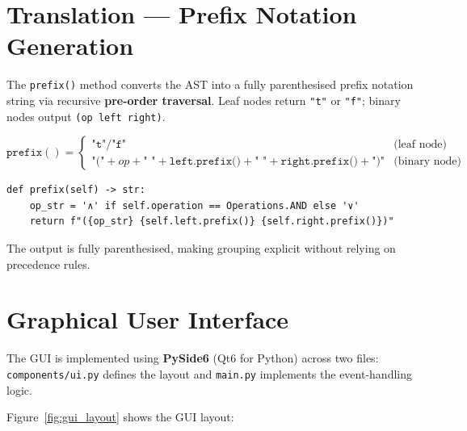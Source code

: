 \section{Translation --- Prefix Notation Generation}

The \texttt{prefix()} method converts the AST into a fully parenthesised prefix notation string via recursive \textbf{pre-order traversal}.  Leaf nodes return \texttt{"t"} or \texttt{"f"}; binary nodes output \texttt{(op left right)}.

\begin{equation}
\texttt{prefix}() = \begin{cases}
\texttt{"t"} / \texttt{"f"} & \text{(leaf node)} \\[4pt]
\texttt{"("} + op + \texttt{" "} + \texttt{left.prefix()} + \texttt{" "} + \texttt{right.prefix()} + \texttt{")"} & \text{(binary node)}
\end{cases}
\end{equation}

\begin{lstlisting}[caption={Prefix translation in \texttt{Expression\_logic}}, label={lst:prefix}]
def prefix(self) -> str:
    op_str = '∧' if self.operation == Operations.AND else '∨'
    return f"({op_str} {self.left.prefix()} {self.right.prefix()})"
\end{lstlisting}

The output is fully parenthesised, making grouping explicit without relying on precedence rules.


\section{Graphical User Interface}

The GUI is implemented using \textbf{PySide6} (Qt6 for Python) across two files: \texttt{components/ui.py} defines the layout and \texttt{main.py} implements the event-handling logic.

Figure~\ref{fig:gui_layout} shows the GUI layout:

